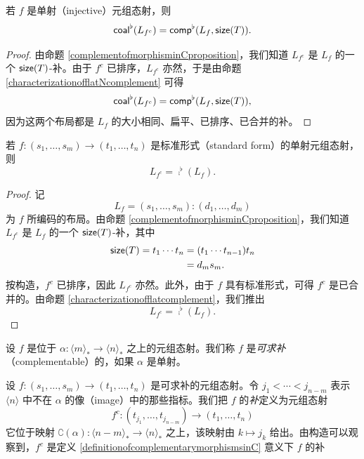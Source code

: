 \begin{proposition}\label{coalescedlayoutoftuplemorphismcomplement}
    若 $f$ 是单射（injective）元组态射，则
    \[
    \mathsf{coal}^\flat(L_{f^c}) = \mathsf{comp}^\flat(L_f,\mathsf{size}(T)).
    \]
\end{proposition}

\begin{proof}
    由命题 \ref{complementofmorphisminCproposition}，我们知道 $L_{f^c}$ 是 $L_f$ 的一个 $\mathsf{size}(T)$-补。由于 $f^c$ 已排序，$L_{f^c}$ 亦然，于是由命题 \ref{characterizationofflatNcomplement} 可得
    \[
    \mathsf{coal}^\flat(L_{f^c}) = \mathsf{comp}^\flat(L_f,\mathsf{size}(T)),
    \]
    因为这两个布局都是 $L_f$ 的大小相同、扁平、已排序、已合并的补。
\end{proof}

\begin{proposition}
    若 $f:(s_1,\dots,s_m) \to (t_1,\dots,t_n)$ 是标准形式（standard form）的单射元组态射，则
    \[
    L_{f^c} = \comp^\flat(L_f).
    \]
\end{proposition}

\begin{proof}
    记
    \[
    L_f = (s_1,\dots,s_m):(d_1,\dots,d_m)
    \]
    为 $f$ 所编码的布局。由命题 \ref{complementofmorphisminCproposition}，我们知道 $L_{f^c}$ 是 $L_f$ 的一个 $\mathsf{size}(T)$-补，其中
    \begin{align*}
    \mathsf{size}(T) = t_1 \cdots t_n & = (t_1 \cdots t_{n-1})t_n\\
    & = d_m s_m.
    \end{align*}
    按构造，$f^c$ 已排序，因此 $L_{f^c}$ 亦然。此外，由于 $f$ 具有标准形式，可得 $f^c$ 是已合并的。由命题 \ref{characterizationofflatcomplement}，我们推出
        \[
    L_{f^c} = \comp^\flat(L_f).
    \]
\end{proof}


\begin{definition}\label{definitionofcomplementabletuplemorphism}
    设 $f$ 是位于 $\alpha:\langle m \rangle_* \to \langle n \rangle_*$ 之上的元组态射。我们称 $f$ 是{\it 可求补}（complementable）的，如果 $\alpha$ 是单射。
\end{definition}

\begin{construction}\label{complementofmorphisminC}
    设 $f:(s_1,\dots,s_m) \to (t_1,\dots,t_n)$ 是可求补的元组态射。令 $j_1 < \cdots < j_{n-m}$ 表示 $\langle n \rangle$ 中不在 $\alpha$ 的像（image）中的那些指标。我们把 $f$ 的{\it 补}定义为元组态射
    \[
    f^c :(t_{j_1},\dots,t_{j_{n-m}}) \to (t_1,\dots,t_n)
    \]
    它位于映射 $\complement(\alpha): \langle n-m \rangle_* \to \langle n \rangle_*$ 之上，该映射由 $k \mapsto j_k$ 给出。由构造可以观察到，$f^c$ 是定义 \ref{definitionofcomplementarymorphismsinC} 意义下 $f$ 的补
\end{construction}

